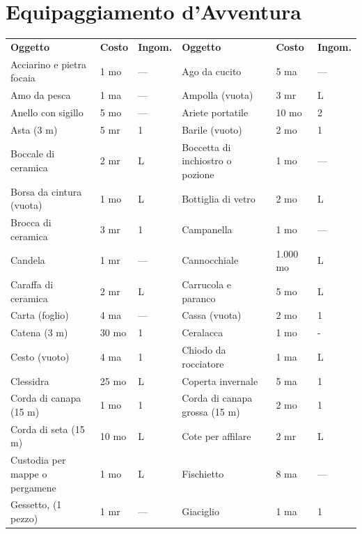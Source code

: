 \documentclass[a4paper,11pt,twoside,openany]{book}
\begin{document}
\section{Equipaggiamento d'Avventura}\label{Equipaggiamento}

\label{equipaggiamento-davventura}


\begin{tabularx}{\textwidth}{XllXll}
	\textbf{Oggetto}    & \textbf{Costo} & \textbf{Ingom.} & \textbf{Oggetto}    & \textbf{Costo}  & \textbf{Ingom.} \\
	Acciarino e pietra focaia   & 1 mo& —   & Ago da cucito & 5 ma& —   \\
	Amo da pesca  & 1 ma& —   & Ampolla (vuota)& 3 mr& L   \\
	Anello con sigillo  & 5 mo& —   & Ariete portatile    & 10 mo& 2   \\
	Asta (3 m)    & 5 mr& 1   & Barile (vuoto)& 2 mo& 1   \\
	Boccale di ceramica & 2 mr& L   & Boccetta di inchiostro o pozione  & 1 mo& —   \\
	Borsa da cintura (vuota)    & 1 mo& L   & Bottiglia di vetro  & 2 mo& L   \\
	Brocca di ceramica  & 3 mr& 1   & Campanella    & 1 mo& —   \\
	Candela & 1 mr& —   & Cannocchiale  & 1.000 mo  & L   \\
	Caraffa di ceramica & 2 mr& L   & Carrucola e paranco & 5 mo& L   \\
	Carta (foglio)& 4 ma& —   & Cassa (vuota) & 2 mo& 1   \\
	Catena (3 m)  & 30 mo    & 1   & Ceralacca& 1 mo& -   \\
	Cesto (vuoto) & 4 ma& 1   & Chiodo da rocciatore& 1 ma& L   \\
	Clessidra& 25 mo    & L   & Coperta invernale   & 5 ma& 1   \\
	Corda di canapa (15 m)& 1 mo& 1   & Corda di canapa grossa (15 m)& 2 mo& 1   \\
	Corda di seta (15 m)& 10 mo    & L   & Cote per affilare   & 2 mr& L   \\
	Custodia per mappe o pergamene    & 1 mo& L   & Fischietto    & 8 ma& —   \\
	Gessetto, (1 pezzo) & 1 mr& —   & Giaciglio& 1 ma& 1   \\

\end{tabularx}
\end{document}
